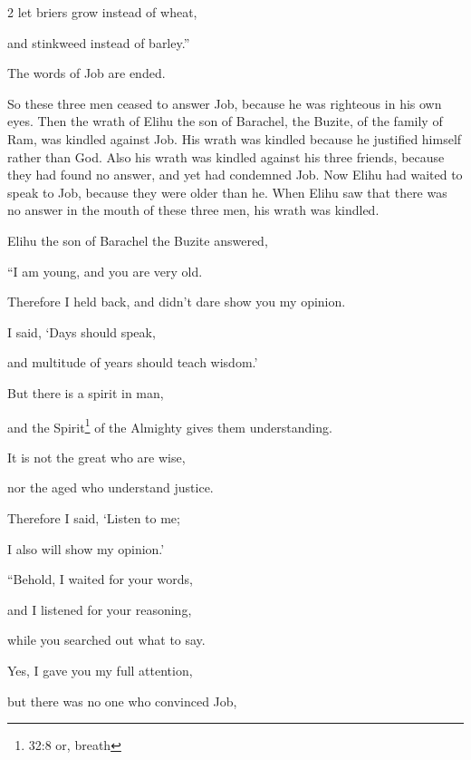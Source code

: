 \begin{multicols}{2}
	\myverse{}let briers grow instead of wheat,
	
	and stinkweed instead of barley.”
	
	\vspace{\baselineskip}
	
	The words of Job are ended.
	
	
	\mychapter{} \myverse*{}So these three men ceased to answer Job, because he was righteous
	in his own eyes.
	\myverse{}Then the wrath of Elihu the son of Barachel, the Buzite, of the family of Ram,
	was kindled against Job. His wrath was kindled because he justified himself rather than God.
	\myverse{}Also his wrath was kindled against his three friends, because they had found
	no answer, and yet had condemned Job.
	\myverse{}Now Elihu had waited to speak to Job, because they were older than he.
	\myverse{}When Elihu saw that there was no answer in the mouth of these three men, his
	wrath was kindled.
	
		\vspace{\baselineskip}
	
	\myverse{}Elihu the son of Barachel the Buzite answered,
	
	“I am young, and you are very old.
	
	Therefore I held back, and didn’t dare show you my opinion.
	
	\myverse{}I said, ‘Days should speak,
	
	and multitude of years should teach wisdom.’
	
	\myverse{}But there is a spirit in man,
	
	and the Spirit\footnote{32:8 or, breath} of the Almighty gives them understanding.
	
	\myverse{}It is not the great who are wise,
	
	nor the aged who understand justice.
	
	\myverse{}Therefore I said, ‘Listen to me;
	
	I also will show my opinion.’
	
		\vspace{\baselineskip}
	
	\myverse{}“Behold, I waited for your words,
	
	and I listened for your reasoning,
	
	while you searched out what to say.
	
	\myverse{}Yes, I gave you my full attention,
	
	but there was no one who convinced Job,
	

\end{multicols}

